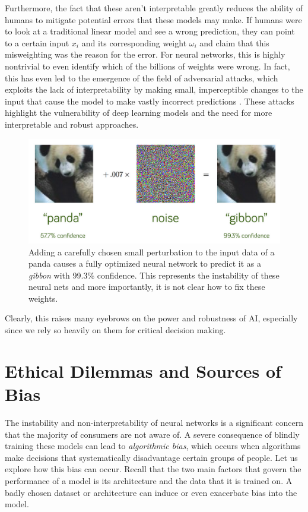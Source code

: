 \documentclass[10pt]{article}
\begin{document}
    Furthermore, the fact that these aren't interpretable greatly reduces the ability of humans to mitigate potential errors that these models may make. If humans were to look at a traditional linear model and see a wrong prediction, they can point to a certain input $x_i$ and its corresponding weight $\omega_i$ and claim that this misweighting was the reason for the error. For neural networks, this is highly nontrivial to even identify which of the billions of weights were wrong. In fact, this has even led to the emergence of the field of adversarial attacks, which exploits the lack of interpretability by making small, imperceptible changes to the input that cause the model to make vastly incorrect predictions \cite{adversarial}. These attacks highlight the vulnerability of deep learning models and the need for more interpretable and robust approaches.

    \begin{figure}[H]
      \centering 
      \includegraphics[scale=0.6]{img/adversarial.png}
      \caption{Adding a carefully chosen small perturbation to the input data of a panda causes a fully optimized neural network to predict it as a \textit{gibbon} with 99.3\% confidence. This represents the instability of these neural nets and more importantly, it is not clear how to fix these weights. } 
      \label{fig:adversarial}
    \end{figure}

    Clearly, this raises many eyebrows on the power and robustness of AI, especially since we rely so heavily on them for critical decision making. 

\section{Ethical Dilemmas and Sources of Bias} 

  The instability and non-interpretability of neural networks is a significant concern that the majority of consumers are not aware of. A severe consequence of blindly training these models can lead to \textit{algorithmic bias}, which occurs when algorithms make decisions that systematically disadvantage certain groups of people. Let us explore how this bias can occur. Recall that the two main factors that govern the performance of a model is its architecture and the data that it is trained on. A badly chosen dataset or architecture can induce or even exacerbate bias into the model. 
\end{document}
